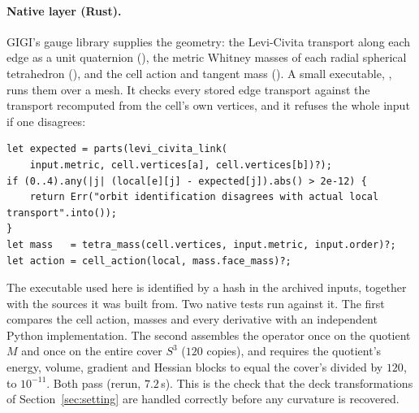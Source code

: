 \documentclass[11pt]{article}
\theoremstyle{definition}
\theoremstyle{remark}
\newcommand{\GIGI}{\textsc{GIGI}}
\begin{document}
\paragraph{Native layer (Rust).}
\GIGI{}'s gauge library supplies the geometry: the Levi-Civita transport along each edge
as a unit quaternion (), the metric
Whitney masses of each radial spherical tetrahedron (),
and the cell action and tangent mass (). A small
executable, , runs them over a mesh. It checks
every stored edge transport against the transport recomputed from the cell's own
vertices, and it refuses the whole input if one disagrees:
\begin{lstlisting}[style=rust]
let expected = parts(levi_civita_link(
    input.metric, cell.vertices[a], cell.vertices[b])?);
if (0..4).any(|j| (local[e][j] - expected[j]).abs() > 2e-12) {
    return Err("orbit identification disagrees with actual local transport".into());
}
let mass   = tetra_mass(cell.vertices, input.metric, input.order)?;
let action = cell_action(local, mass.face_mass)?;
\end{lstlisting}
The executable used here is identified by a hash in the archived inputs, together with the
sources it was built from. Two native tests run against it. The first compares the cell action, masses
and every derivative with an independent Python implementation. The second assembles the
operator once on the quotient $M$ and once on the entire cover $S^3$ ($120$ copies), and
requires the quotient's energy, volume, gradient and Hessian blocks to equal the cover's
divided by $120$, to $10^{-11}$. Both pass (rerun, $7.2$\,s). This is
the check that the deck transformations of Section~\ref{sec:setting} are handled
correctly before any curvature is recovered.
\end{document}
